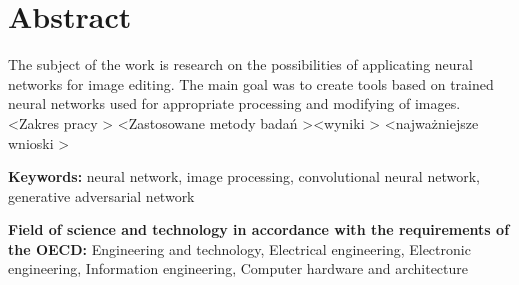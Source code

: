 \section*{Abstract}
  \tab The subject of the work is research on the possibilities of applicating
  neural networks for image editing. The main goal was to create tools based on
  trained neural networks used for appropriate processing and modifying of
  images. \textless Zakres pracy \textgreater
  \newline
  \tab \textless Zastosowane metody badań \textgreater \textless wyniki \textgreater 
  \textless najważniejsze wnioski \textgreater


  \bigskip

  \noindent\textbf{Keywords:} neural network, image processing, convolutional
  neural network, generative adversarial network

  \bigskip

  \noindent\textbf{Field of science and technology in accordance with the
  requirements of the OECD:} Engineering and technology, Electrical engineering,
  Electronic engineering, Information engineering, Computer hardware and
  architecture
